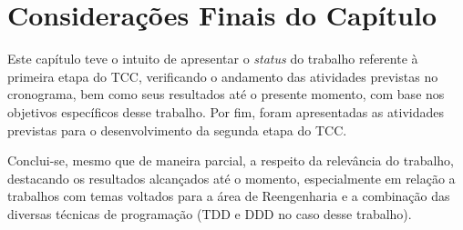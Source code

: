 \section{Considerações Finais do Capítulo}
\label{section:consideracoes_finais_status}

Este capítulo teve o intuito de apresentar o \textit{status} do trabalho referente à primeira etapa do TCC, 
verificando o andamento das atividades previstas no cronograma, bem como seus resultados até o presente 
momento, com base nos objetivos específicos desse trabalho. Por fim, foram apresentadas as atividades 
previstas para o desenvolvimento da segunda etapa do TCC.

Conclui-se, mesmo que de maneira parcial, a respeito da relevância do trabalho, destacando os resultados 
alcançados até o momento, especialmente em relação a trabalhos com temas voltados para a área de Reengenharia 
e a combinação das diversas técnicas de programação (TDD e DDD no caso desse trabalho).
